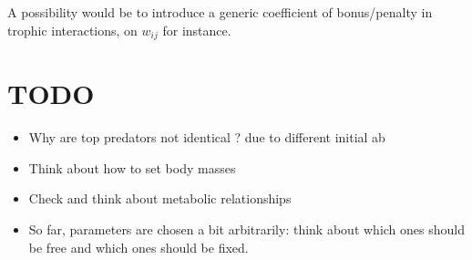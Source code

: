\documentclass[a4paper,11pt]{article}
\begin{document}
    A possibility would be to introduce a generic coefficient of bonus/penalty 
in trophic interactions, on $w_{ij}$ for instance. 
  
  \newpage
  \section*{TODO}
    \begin{itemize}
      \item Why are top predators not identical ? due to different initial ab
      \item Think about how to set body masses
      \item Check and think about metabolic relationships
      \item So far, parameters are chosen a bit arbitrarily: think about which 
            ones should be free and which ones should be fixed.
    \end{itemize}
  
  
  \newpage
  \begin{footnotesize}
    \printbibliography
  \end{footnotesize}
  
\end{document}
